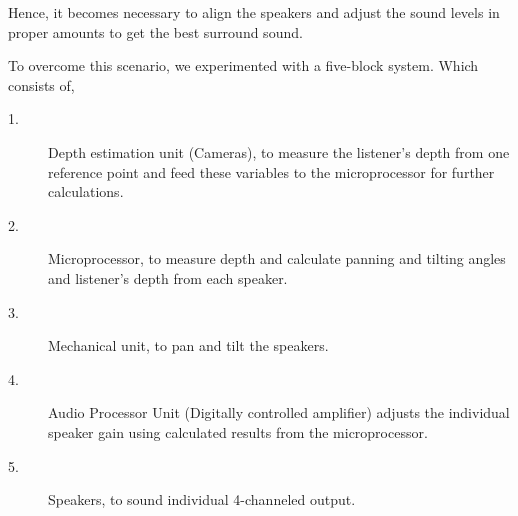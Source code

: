 \documentclass[../../../patent_v1.tex]{subfiles}
\begin{document}
Hence, it becomes necessary to align the speakers and adjust the sound levels in proper 
amounts to get the best surround sound.

To overcome this scenario, we experimented with a five-block system. 
Which consists of,

\begin{description}
    \item[1.]Depth estimation unit (Cameras), to measure the listener's depth from one 
    reference point and feed these variables to the microprocessor for further 
    calculations.
    \item[2.]Microprocessor, to measure depth and calculate 
    panning and tilting angles and listener's depth
    from each speaker.
    \item[3.]Mechanical unit, to pan and tilt the speakers.
    \item[4.]Audio Processor Unit (Digitally controlled amplifier) adjusts the individual 
    speaker gain using calculated results from the microprocessor.
    \item[5.]Speakers, to sound individual 4-channeled output.
\end{description} 
\end{document}
